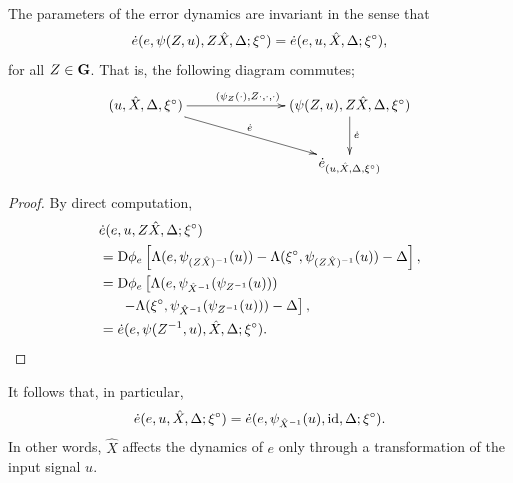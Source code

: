 \documentclass{article}
\begin{document}
\begin{proposition}
The parameters of the error dynamics are invariant in the sense that
\begin{align*}
    \dot{e}(e, \psi(Z, u), Z\hat{X}, \Delta; {\xi}^\circ)
    = \dot{e}(e, u, \hat{X}, \Delta; {\xi}^\circ),
\end{align*}
for all $Z \in \mathbf{G}$.
That is, the following diagram commutes;
\[
\xymatrixcolsep{70pt}\xymatrix{
(u, \hat{X}, \Delta, \mr{\xi})
\ar[r]^{(\psi_Z(\cdot), Z \cdot, \cdot, \cdot)}
\ar[rd]^{\dot{e}}
&
(\psi(Z, u), Z\hat{X}, \Delta, \mr{\xi})
\ar[d]^{\dot{e}}
\\
&
\dot{e}_{(u, \hat{X}, \Delta, \mr{\xi})}
}
\]
\end{proposition}


\begin{proof}
By direct computation,
\begin{align*}
    &\dot{e}(e, u, Z \hat{X}, \Delta; {\xi}^\circ) \\
    &= \mathrm{D} \phi_e
    \left[\Lambda(e, \psi_{(Z\hat{X})^{-1}}(u))
    - \Lambda({\xi}^\circ, \psi_{(Z\hat{X})^{-1}}(u)) - \Delta\right], \\
    &= \mathrm{D} \phi_e \left[\Lambda(e, \psi_{\hat{X}^{-1}}(\psi_{Z^{-1}}(u)))
    \right. \\ &\phantom{==} \left.
    - \Lambda({\xi}^\circ, \psi_{\hat{X}^{-1}}(\psi_{Z^{-1}}(u))) - \Delta\right], \\
    &= \dot{e}(e, \psi(Z^{-1}, u), \hat{X}, \Delta; {\xi}^\circ).
\end{align*}
\end{proof}

It follows that, in particular,
\begin{align}
    \dot{e}(e, u, \hat{X}, \Delta; {\xi}^\circ)
    = \dot{e}(e, \psi_{\hat{X}^{-1}}(u), \mathrm{id}, \Delta; {\xi}^\circ).
\end{align}
In other words, $\hat{X}$ affects the dynamics of $e$ only through a transformation of the input signal $u$.
\end{document}
